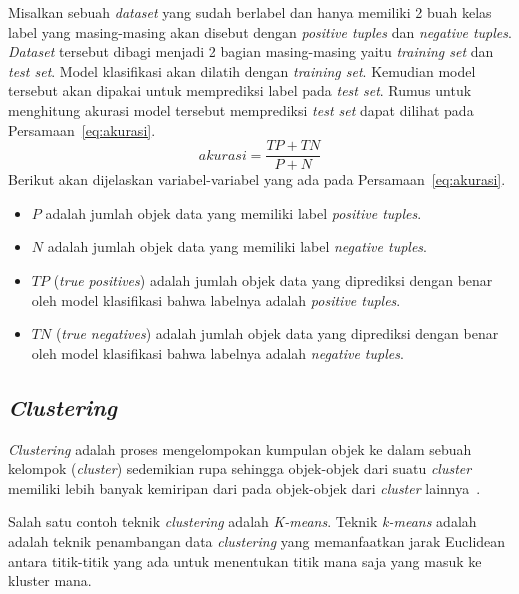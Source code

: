 Misalkan sebuah \textit{dataset} yang sudah berlabel dan hanya memiliki 2 buah kelas label yang masing-masing akan disebut dengan \textit{positive tuples} dan \textit{negative tuples}. \textit{Dataset} tersebut dibagi menjadi 2 bagian masing-masing yaitu \textit{training set} dan \textit{test set}. Model klasifikasi akan dilatih dengan \textit{training set}. Kemudian model tersebut akan dipakai untuk memprediksi label pada \textit{test set}. Rumus untuk menghitung akurasi model tersebut memprediksi \textit{test set} dapat dilihat pada Persamaan~\ref{eq:akurasi}.
\begin{equation}\label{eq:akurasi}
	akurasi=\frac{TP+TN}{P+N}
\end{equation}
Berikut akan dijelaskan variabel-variabel yang ada pada Persamaan~\ref{eq:akurasi}.
\begin{itemize}
	\item \(P\) adalah jumlah objek data yang memiliki label \textit{positive tuples}.
	\item \(N\) adalah jumlah objek data yang memiliki label \textit{negative tuples}.
	\item \(TP\) (\textit{true positives}) adalah jumlah objek data yang diprediksi dengan benar oleh model klasifikasi bahwa labelnya adalah \textit{positive tuples}.
	\item \(TN\) (\textit{true negatives}) adalah jumlah objek data yang diprediksi dengan benar oleh model klasifikasi bahwa labelnya adalah \textit{negative tuples}.
\end{itemize}

\subsection{\textit{Clustering}}
\label{subsec:clustering}

\textit{Clustering} adalah proses mengelompokan kumpulan objek ke dalam sebuah kelompok (\textit{cluster}) sedemikian rupa sehingga objek-objek dari suatu \textit{cluster} memiliki lebih banyak kemiripan dari pada objek-objek dari \textit{cluster} lainnya~\cite{mendes:17:ppdmieee}. 

Salah satu contoh teknik \textit{clustering} adalah \textit{K-means}. Teknik \textit{k-means} adalah adalah teknik penambangan data \textit{clustering} yang memanfaatkan jarak Euclidean antara titik-titik yang ada untuk menentukan titik mana saja yang masuk ke kluster mana.

